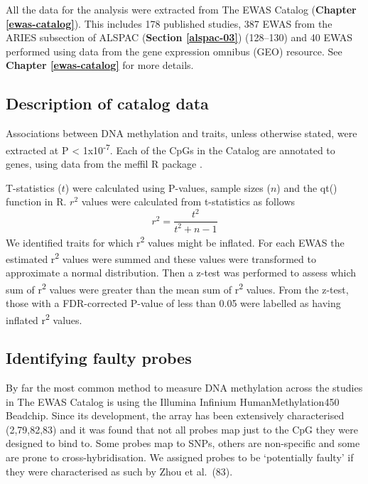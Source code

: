 \documentclass[11pt,oneside]{bristolthesis}
\begin{document}
All the data for the analysis were extracted from The EWAS Catalog (\textbf{Chapter \ref{ewas-catalog}}). This includes 178 published studies, 387 EWAS from the ARIES subsection of ALSPAC (\textbf{Section \ref{alspac-03}}) (128--130) and 40 EWAS performed using data from the gene expression omnibus (GEO) resource. See \textbf{Chapter \ref{ewas-catalog}} for more details.

\hypertarget{description-of-data}{%
\subsection*{Description of catalog data}\label{description-of-data}}

Associations between DNA methylation and traits, unless otherwise stated, were extracted at P \textless{} 1x10\textsuperscript{-7}. Each of the CpGs in the Catalog are annotated to genes, using data from the meffil R package .

T-statistics (\(t\)) were calculated using P-values, sample sizes (\(n\)) and the qt() function in R. \(r^2\) values were calculated from t-statistics as follows
\begin{equation}
    r^2 = \frac{t^2} {t^2 + n - 1}
    \label{eq:r-squared}
\end{equation}
We identified traits for which r\textsuperscript{2} values might be inflated. For each EWAS the estimated r\textsuperscript{2} values were summed and these values were transformed to approximate a normal distribution. Then a z-test was performed to assess which sum of r\textsuperscript{2} values were greater than the mean sum of r\textsuperscript{2} values. From the z-test, those with a FDR-corrected P-value of less than 0.05 were labelled as having inflated r\textsuperscript{2} values.

\hypertarget{identifying-faulty-probes}{%
\subsection{Identifying faulty probes}\label{identifying-faulty-probes}}

By far the most common method to measure DNA methylation across the studies in The EWAS Catalog is using the Illumina Infinium HumanMethylation450 Beadchip. Since its development, the array has been extensively characterised (2,79,82,83) and it was found that not all probes map just to the CpG they were designed to bind to. Some probes map to SNPs, others are non-specific and some are prone to cross-hybridisation. We assigned probes to be `potentially faulty' if they were characterised as such by Zhou et al.~(83).
\end{document}
